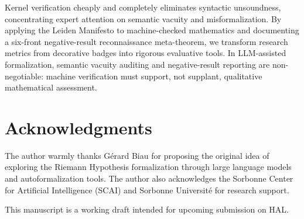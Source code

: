 \documentclass[11pt,a4paper]{article}
\theoremstyle{definition}
\theoremstyle{remark}
\begin{document}
Kernel verification cheaply and completely eliminates syntactic unsoundness, concentrating expert attention on semantic vacuity and misformalization. By applying the Leiden Manifesto to machine-checked mathematics and documenting a six-front negative-result reconnaissance meta-theorem, we transform research metrics from decorative badges into rigorous evaluative tools. In LLM-assisted formalization, semantic vacuity auditing and negative-result reporting are non-negotiable: machine verification must support, not supplant, qualitative mathematical assessment.

\section*{Acknowledgments}

The author warmly thanks G\'erard Biau for proposing the original idea of exploring the Riemann Hypothesis formalization through large language models and autoformalization tools. The author also acknowledges the Sorbonne Center for Artificial Intelligence (SCAI) and Sorbonne Universit\'e for research support.

This manuscript is a working draft intended for upcoming submission on HAL.
\end{document}
